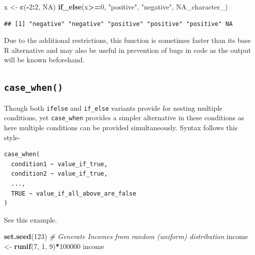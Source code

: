 \documentclass[
]{book}
\newenvironment{Shaded}{\begin{snugshade}}{\end{snugshade}}
\newcommand{\CommentTok}[1]{\textcolor[rgb]{0.56,0.35,0.01}{\textit{#1}}}
\newcommand{\ConstantTok}[1]{\textcolor[rgb]{0.56,0.35,0.01}{#1}}
\newcommand{\DecValTok}[1]{\textcolor[rgb]{0.00,0.00,0.81}{#1}}
\newcommand{\FunctionTok}[1]{\textcolor[rgb]{0.13,0.29,0.53}{\textbf{#1}}}
\newcommand{\NormalTok}[1]{#1}
\newcommand{\OtherTok}[1]{\textcolor[rgb]{0.56,0.35,0.01}{#1}}
\newcommand{\SpecialCharTok}[1]{\textcolor[rgb]{0.81,0.36,0.00}{\textbf{#1}}}
\newcommand{\StringTok}[1]{\textcolor[rgb]{0.31,0.60,0.02}{#1}}
\begin{document}
\begin{Shaded}
\begin{Highlighting}[]
\NormalTok{x }\OtherTok{\textless{}{-}} \FunctionTok{c}\NormalTok{(}\SpecialCharTok{{-}}\DecValTok{2}\SpecialCharTok{:}\DecValTok{2}\NormalTok{, }\ConstantTok{NA}\NormalTok{)}
\FunctionTok{if\_else}\NormalTok{(x}\SpecialCharTok{\textgreater{}=}\DecValTok{0}\NormalTok{, }\StringTok{"positive"}\NormalTok{, }\StringTok{"negative"}\NormalTok{, }\ConstantTok{NA\_character\_}\NormalTok{)}
\end{Highlighting}
\end{Shaded}

\begin{verbatim}
## [1] "negative" "negative" "positive" "positive" "positive" NA
\end{verbatim}

Due to the additional restrictions, this function is sometimes faster than its base R alternative and may also be useful in prevention of bugs in code as the output will be known beforehand.

\hypertarget{case_when}{%
\subsection*{\texorpdfstring{\texttt{case\_when()}}{case\_when()}}\label{case_when}}

Though both \texttt{ifelse} and \texttt{if\_else} variants provide for nesting multiple conditions, yet \texttt{case\_when} provides a simpler alternative in these conditions as here multiple conditions can be provided simultaneously. Syntax follows this style-

\begin{verbatim}
case_when(
  condition1 ~ value_if_true,
  condition2 ~ value_if_true,
  ...,
  TRUE ~ value_if_all_above_are_false
)
\end{verbatim}

See this example.

\begin{Shaded}
\begin{Highlighting}[]
\FunctionTok{set.seed}\NormalTok{(}\DecValTok{123}\NormalTok{)}
\CommentTok{\# Generate Incomes from random (uniform) distribution}
\NormalTok{income }\OtherTok{\textless{}{-}} \FunctionTok{runif}\NormalTok{(}\DecValTok{7}\NormalTok{, }\DecValTok{1}\NormalTok{, }\DecValTok{9}\NormalTok{)}\SpecialCharTok{*}\DecValTok{100000}
\NormalTok{income}
\end{Highlighting}
\end{Shaded}
\end{document}
